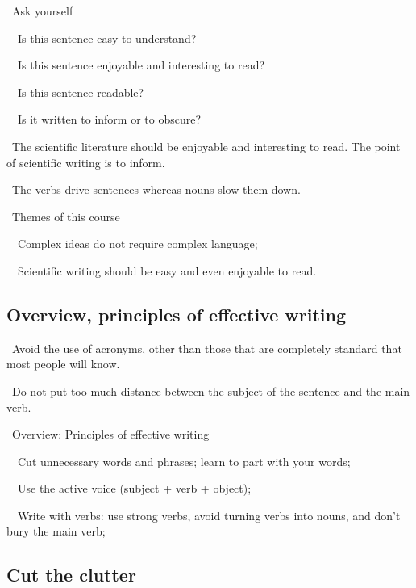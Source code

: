 \documentclass[a4paper, 12pt]{article}
\begin{document}
\par\textbullet\ Ask yourself
\par\ \textopenbullet\ Is this sentence easy to understand?
\par\ \textopenbullet\ Is this sentence enjoyable and interesting to read?
\par\ \textopenbullet\ Is this sentence readable?
\par\ \textopenbullet\ Is it written to inform or to obscure?

\par\textbullet\ The scientific literature should be enjoyable and interesting to read. The point of scientific writing is to inform.

\par\textbullet\ The verbs drive sentences whereas nouns slow them down.

\par\textbullet\ Themes of this course
\par\ \textopenbullet\ Complex ideas do not require complex language;
\par\ \textopenbullet\ Scientific writing should be easy and even enjoyable to read.

\subsection{Overview, principles of effective writing}

\par\textbullet\ Avoid the use of acronyms, other than those that are completely standard that most people will know.

\par\textbullet\ Do not put too much distance between the subject of the sentence and the main verb.

\par\textbullet\ Overview: Principles of effective writing
\par\ \textopenbullet\ Cut unnecessary words and phrases; learn to part with your words;
\par\ \textopenbullet\ Use the active voice (subject + verb + object);
\par\ \textopenbullet\ Write with verbs: use strong verbs, avoid turning verbs into nouns, and don't bury the main verb;

\newpage\subsection{Cut the clutter}
\end{document}

